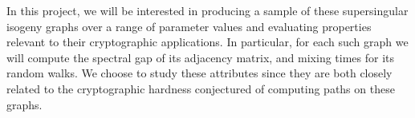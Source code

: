In this project, we will be interested in producing a sample of these supersingular isogeny graphs over a range of parameter values and evaluating properties relevant to their cryptographic applications. In particular, for each such graph we will compute the spectral gap of its adjacency matrix, and mixing times for its random walks. We choose to study these attributes since they are both closely related to the cryptographic hardness conjectured of computing paths on these graphs. 
